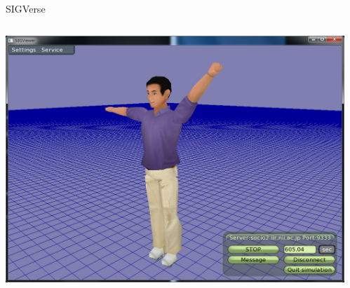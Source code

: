 \documentclass[11pt]{beamer}
\begin{document}
\begin{frame}
\end{frame}

\begin{frame}{SIGVerse}		
\begin{columns}[t]
	\begin{column}[T]{.6\textwidth}
		\includegraphics[width=1\textwidth]{images/manViewer.png}
	\end{column}
	\begin{column}[T]{.4\textwidth}

\end{column}
\end{columns}
\end{frame}
\end{document}
